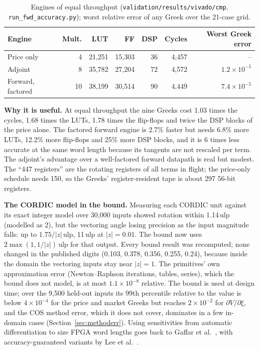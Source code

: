 \documentclass[11pt,a4paper]{article}
\newcommand{\useful}[1]{\par\noindent\textbf{\textcolor{accent}{Why it is useful.}} #1\par}
\newcommand{\hi}{\rowcolor{accentsoft}}
\begin{document}
\begin{table}[H]
\centering
\small
\begin{tabular}{@{}lrrrrrr@{}}
\toprule
\textbf{Engine} & \textbf{Mult.} & \textbf{LUT} & \textbf{FF} & \textbf{DSP} & \textbf{Cycles} & \textbf{Worst Greek error}\\
\midrule
Price only & 4 & 21,251 & 15,303 & 36 & 4,457 & --\\
\hi Adjoint & 8 & 35,782 & 27,204 & 72 & 4,572 & $1.2\times10^{-5}$\\
Forward, factored & 10 & 38,199 & 30,514 & 90 & 4,449 & $7.4\times10^{-5}$\\
\bottomrule
\end{tabular}
\caption{Engines of equal throughput (\texttt{validation/results/vivado/cmp},
\texttt{run\_fwd\_accuracy.py}); worst relative error of any Greek over the 21-case grid.}
\end{table}

\useful{At equal throughput the nine Greeks cost 1.03 times the cycles, 1.68 times the LUTs,
1.78 times the flip-flops and twice the DSP blocks of the price alone. The factored forward
engine is 2.7\% faster but needs 6.8\% more LUTs, 12.2\% more flip-flops and 25\% more DSP
blocks, and it is 6 times less accurate at the same word length because its tangents are not
rescaled per term. The adjoint's advantage over a well-factored forward datapath is real but
modest. The ``447 registers'' are the rotating registers of all terms in flight; the price-only
schedule needs 150, so the Greeks' register-resident tape is about 297 56-bit registers.}

\textbf{The CORDIC model in the bound.} Measuring each CORDIC unit against its exact integer
model over 30,000 inputs showed rotation within 1.14\,ulp (modelled as 2), but the vectoring
angle losing precision as the input magnitude falls: up to $1.75/|z|$\,ulp, 11\,ulp at
$|z|=0.01$. The bound now uses $2\max(1,1/|z|)$\,ulp for that output. Every bound result was
recomputed; none changed in the published digits (0.103, 0.378, 0.356, 0.255, 0.24), because
inside the domain the vectoring inputs stay near $|z|=1$. The primitives' own approximation
error (Newton--Raphson iterations, tables, series), which the bound does not model, is at most
$1.1\times10^{-8}$ relative. The bound is used at design time; over the 9,500 held-out inputs its
99th percentile relative to the value is below $4\times10^{-4}$ for the price and market Greeks
but reaches $2\times10^{-2}$ for $\partial V/\partial\xi$, and the COS method error, which it does
not cover, dominates in a few in-domain cases (Section~\ref{sec:methoderr}). Using sensitivities
from automatic differentiation to size FPGA word lengths goes back to Gaffar et
al.~\cite{gaffar}, with accuracy-guaranteed variants by Lee et al.~\cite{lee06}.
\end{document}
